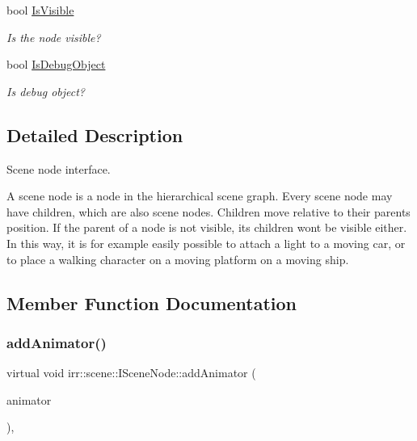 \begin{DoxyCompactItemize}
\mbox{\label{classirr_1_1scene_1_1ISceneNode_aa834128c57215457914ef46d9b18cc5e}} 
bool \hyperlink{classirr_1_1scene_1_1ISceneNode_aa834128c57215457914ef46d9b18cc5e}{Is\+Visible}
\begin{DoxyCompactList}\small\item\em Is the node visible? \end{DoxyCompactList}\item 
\mbox{\label{classirr_1_1scene_1_1ISceneNode_a8f1ba7c5e77eecc2adc6d12df0d27dd6}} 
bool \hyperlink{classirr_1_1scene_1_1ISceneNode_a8f1ba7c5e77eecc2adc6d12df0d27dd6}{Is\+Debug\+Object}
\begin{DoxyCompactList}\small\item\em Is debug object? \end{DoxyCompactList}\end{DoxyCompactItemize}


\subsection{Detailed Description}
Scene node interface. 

A scene node is a node in the hierarchical scene graph. Every scene node may have children, which are also scene nodes. Children move relative to their parent\textquotesingle{}s position. If the parent of a node is not visible, its children won\textquotesingle{}t be visible either. In this way, it is for example easily possible to attach a light to a moving car, or to place a walking character on a moving platform on a moving ship. 

\subsection{Member Function Documentation}
\mbox{\label{classirr_1_1scene_1_1ISceneNode_a0e5cd342cd7293c136e53e2c2c5e0f3a}} 
\subsubsection{\texorpdfstring{add\+Animator()}{addAnimator()}}
{\footnotesize\ttfamily virtual void irr\+::scene\+::\+I\+Scene\+Node\+::add\+Animator (\begin{DoxyParamCaption}\item[{\hyperlink{classirr_1_1scene_1_1ISceneNodeAnimator}{I\+Scene\+Node\+Animator} $\ast$}]{animator }\end{DoxyParamCaption})\hspace{0.3cm}{\ttfamily [inline]}, {\ttfamily [virtual]}}



